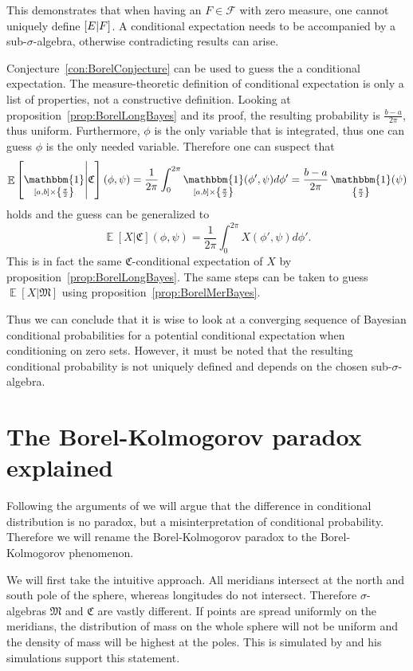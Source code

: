 \documentclass[twoside,a4paper]{report}
\theoremstyle{plain}
\theoremstyle{definition}
\theoremstyle{remark}
\numberwithin{equation}{chapter}
\let\P\relax
\DeclareMathOperator{\P}{\mathbb{P}}
\DeclareMathOperator{\E}{\mathbb{E}}
\DeclareMathOperator{\1}{\mathbbm{1}}
\newcommand{\F}{\mathcal{F}}
\begin{document}
This demonstrates that when having an $F\in\F$ with zero measure, one cannot uniquely define $\P[E|F]$. A conditional expectation needs to be accompanied by a sub-$\sigma$-algebra, otherwise contradicting results can arise.

Conjecture~\ref{con:BorelConjecture} can be used to guess the a conditional expectation. The measure-theoretic definition of conditional expectation is only a list of properties, not a constructive definition. Looking at proposition~\ref{prop:BorelLongBayes} and its proof, the resulting probability is $\frac{b-a}{2\pi}$, thus uniform. Furthermore, $\phi$ is the only variable that is integrated, thus one can guess $\phi$ is the only needed variable. Therefore one can suspect that
\begin{equation}
\E\left[\1_{[a,b]\times\left\{\frac{\pi}{2}\right\}}\middle|\mathfrak{C}\right](\phi,\psi)=\frac{1}{2\pi}\int_0^{2\pi}\1_{[a,b]\times\left\{\frac{\pi}{2}\right\}}(\phi',\psi)d\phi'=\frac{b-a}{2\pi}\1_{\left\{\frac{\pi}{2}\right\}}(\psi)
\end{equation}
holds and the guess can be generalized to
\begin{equation}
\E[X|\mathfrak{C}](\phi,\psi)=\frac{1}{2\pi}\int_0^{2\pi}X(\phi',\psi)d\phi'.
\end{equation}
This is in fact the same $\mathfrak{C}$-conditional expectation of $X$ by proposition~\ref{prop:BorelLongBayes}. The same steps can be taken to guess $\E[X|\mathfrak{M}]$ using proposition~\ref{prop:BorelMerBayes}. 

Thus we can conclude that it is wise to look at a converging sequence of Bayesian conditional probabilities for a potential conditional expectation when conditioning on zero sets. However, it must be noted that the resulting conditional probability is not uniquely defined and depends on the chosen sub-$\sigma$-algebra.

\section{The Borel-Kolmogorov paradox explained}
Following the arguments of \cite{Gyenis17} we will argue that the difference in conditional distribution is no paradox, but a misinterpretation of conditional probability. Therefore we will rename the Borel-Kolmogorov paradox to the Borel-Kolmogorov phenomenon.

We will first take the intuitive approach. All meridians intersect at the north and south pole of the sphere, whereas longitudes do not intersect. Therefore $\sigma$-algebras $\mathfrak{M}$ and $\mathfrak{C}$ are vastly different. If points are spread uniformly on the meridians, the distribution of mass on the whole sphere will not be uniform and the density of mass will be highest at the poles. This is simulated by \cite{Weisstein} and his simulations support this statement.
\end{document}
